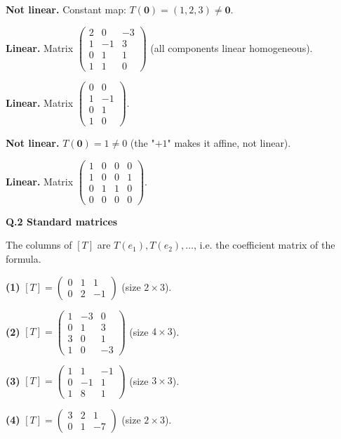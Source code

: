 \begin{description}[leftmargin=1.2cm,itemsep=2pt]
\item[11.] \textbf{Not linear.} Constant map: $T(\mathbf0)=(1,2,3)\neq\mathbf0$.
\item[12.] \textbf{Linear.} Matrix $\begin{pmatrix}2&0&-3\\1&-1&3\\0&1&1\\1&1&0\end{pmatrix}$ (all components linear homogeneous).
\item[13.] \textbf{Linear.} Matrix $\begin{pmatrix}0&0\\1&-1\\0&1\\1&0\end{pmatrix}$.
\item[14.] \textbf{Not linear.} $T(\mathbf 0)=1\neq0$ (the "$+1$" makes it affine, not linear).
\item[15.] \textbf{Linear.} Matrix $\begin{pmatrix}1&0&0&0\\1&0&0&1\\0&1&1&0\\0&0&0&0\end{pmatrix}$.
\end{description}
\medskip\noindent\textbf{Q.2  Standard matrices}\par\smallskip
The columns of $[T]$ are $T(e_1),T(e_2),\dots$, i.e. the coefficient matrix of the formula.

\noindent\textbf{(1)} $[T]=\begin{pmatrix}0 & 1 & 1 \\ 0 & 2 & -1\end{pmatrix}$ (size $2\times3$).


\noindent\textbf{(2)} $[T]=\begin{pmatrix}1 & -3 & 0 \\ 0 & 1 & 3 \\ 3 & 0 & 1 \\ 1 & 0 & -3\end{pmatrix}$ (size $4\times3$).


\noindent\textbf{(3)} $[T]=\begin{pmatrix}1 & 1 & -1 \\ 0 & -1 & 1 \\ 1 & 8 & 1\end{pmatrix}$ (size $3\times3$).


\noindent\textbf{(4)} $[T]=\begin{pmatrix}3 & 2 & 1 \\ 0 & 1 & -7\end{pmatrix}$ (size $2\times3$).


